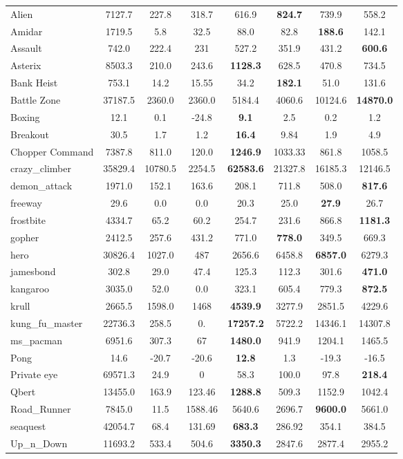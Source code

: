 \documentclass{article}
\begin{document}
\begin{table*}[h!]
\begin{center}
\begin{small}
\begin{sc}
\begin{tabular}{lccccccc}
Alien & 7127.7 & 227.8 & 318.7  & 616.9 & {\bf 824.7} & 739.9 & 558.2 \\
Amidar & 1719.5 & 5.8 & 32.5 & 88.0 & 82.8 & {\bf 188.6}  & 142.1  \\
Assault & 742.0 & 222.4 & 231 &  527.2 & 351.9 & 431.2 & {\bf 600.6} \\
Asterix & 8503.3 & 210.0 & 243.6 & {\textbf{1128.3}} & 628.5 & 470.8 & 734.5 \\
Bank Heist & 753.1 & 14.2 & 15.55 & 34.2 & {\bf 182.1} & 51.0 & 131.6 \\
Battle Zone & 37187.5 & 2360.0 & 2360.0 & 5184.4 & 4060.6 & 10124.6 & {\bf 14870.0} \\
Boxing & 12.1 & 0.1 & -24.8 & {\textbf{9.1}} & 2.5 & 0.2 & 1.2 \\
Breakout & 30.5 & 1.7 & 1.2 & {\bf 16.4} & 9.84 & 1.9 & 4.9 \\
Chopper Command & 7387.8 & 811.0 & 120.0 & {\textbf{1246.9}} & 1033.33 & 861.8 & 1058.5 \\
crazy\_climber & 35829.4 & 10780.5 & 2254.5 & {\textbf{62583.6}} & 21327.8 & 16185.3 & 12146.5 \\
demon\_attack & 1971.0 & 152.1 & 163.6 & 208.1 & 711.8 & 508.0 & {\bf 817.6} \\
freeway & 29.6 & 0.0 & 0.0 & 20.3 & 25.0 & {\textbf{27.9}} & 26.7 \\
frostbite & 4334.7 & 65.2 & 60.2 & 254.7 & 231.6 & 866.8 & {\bf 1181.3} \\
gopher & 2412.5 & 257.6 & 431.2 & 771.0 & {\bf 778.0} & 349.5  & 669.3 \\
hero & 30826.4 & 1027.0 & 487 & 2656.6 & 6458.8 & {\textbf{6857.0}} & 6279.3 \\
jamesbond & 302.8 & 29.0 & 47.4 & 125.3 & 112.3 & 301.6 & {\bf 471.0} \\
kangaroo & 3035.0 & 52.0 & 0.0 & 323.1 & 605.4 & 779.3 & {\bf 872.5} \\
krull & 2665.5 & 1598.0 & 1468 & {\textbf{4539.9}} & 3277.9 & 2851.5 & 4229.6 \\
kung\_fu\_master & 22736.3 & 258.5  & 0. & {\textbf{17257.2}} & 5722.2 & 14346.1 & 14307.8 \\
ms\_pacman & 6951.6  & 307.3 & 67 & {\bf 1480.0} & 941.9 & 1204.1 & 1465.5 \\
Pong & 14.6   & -20.7 & -20.6 & {\textbf{12.8}} & 1.3 & -19.3 & -16.5 \\
Private eye & 69571.3 & 24.9 & 0 & 58.3 & 100.0 & 97.8 & {\bf 218.4} \\
Qbert & 13455.0 & 163.9 & 123.46 & {\textbf{1288.8}} & 509.3 & 1152.9 & 1042.4 \\
Road\_Runner & 7845.0 & 11.5 & 1588.46 & 5640.6 & 2696.7 & {\textbf{9600.0}} & 5661.0 \\
seaquest & 42054.7 & 68.4 & 131.69 & {\textbf{683.3}}  & 286.92 & 354.1 & 384.5 \\
Up\_n\_Down & 11693.2 & 533.4 & 504.6 & {\textbf{3350.3}} & 2847.6 & 2877.4  &  2955.2 \\


\end{tabular}
\end{sc}
\end{small}
\end{center}
\end{table*}
\end{document}
